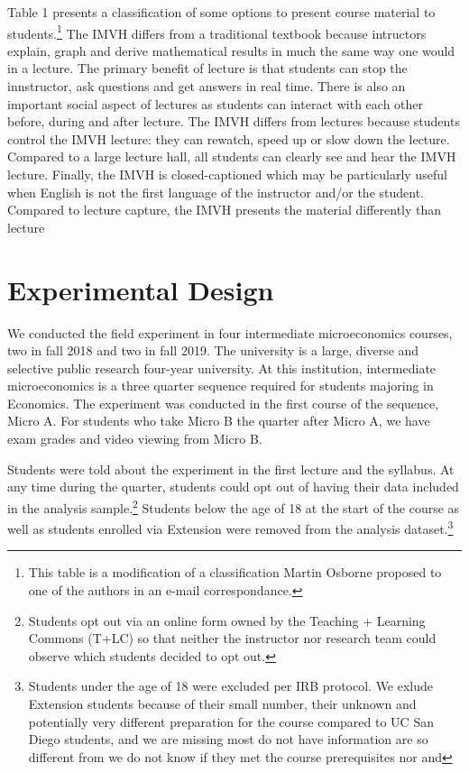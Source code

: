 \documentclass[12pt]{article}
\begin{document}
Table 1 presents a classification of some options to present course material to students.\footnote{This table is a modification of a classification Martin Osborne proposed to one of the authors in an e-mail correspondance.} The IMVH differs from a traditional textbook because intructors explain, graph and derive mathematical results in much the same way one would in a lecture. The primary benefit of lecture is that students can stop the innstructor, ask questions and get answers in real time. There is also an important social aspect of lectures as students can interact with each other before, during and after lecture. The IMVH differs from lectures because students control the IMVH lecture: they can rewatch, speed up or slow down the lecture. Compared to a large lecture hall, all students can clearly see and hear the IMVH lecture. Finally, the IMVH is closed-captioned which may be particularly useful when English is not the first language of the instructor and/or the student. Compared to lecture capture, the IMVH presents the material differently than lecture


\section{Experimental Design} \label{expdesign}
We conducted the field experiment in four intermediate microeconomics courses, two in fall 2018 and two in fall 2019. The university is a large, diverse and selective public research four-year university. At this institution, intermediate microeconomics is a three quarter sequence required for students majoring in Economics. The experiment was conducted in the first course of the sequence, Micro A. For students who take Micro B the quarter after Micro A, we have exam grades and video viewing from Micro B.

Students were told about the experiment in the first lecture and the syllabus. At any time during the quarter, students could opt out of having their data included in the analysis sample.\footnote{Students opt out via an online form owned by the Teaching + Learning Commons (T+LC) so that neither the instructor nor research team could observe which students decided to opt out.} Students below the age of 18 at the start of the course as well as students enrolled via Extension were removed from the analysis dataset.\footnote{Students under the age of 18 were excluded per IRB protocol. We exlude Extension students because of their small number, their unknown and potentially very different preparation for the course compared to UC San Diego students, and we are missing most do not have information are so different from we do not know if they met the course prerequisites nor and }
\end{document}
